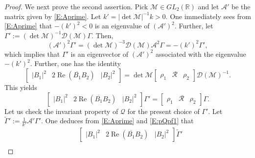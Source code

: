 \documentclass[11pt,a4paper,oneside]{amsart}
\theoremstyle{plain}
\theoremstyle{remark}
\numberwithin{equation}{section}
\newcommand{\R}{\mathbb{R}}
\renewcommand{\Re}{\operatorname{Re}}
\theoremstyle{definition}
\begin{document}
\begin{proof}
We next prove the second assertion.
Pick $\mathscr{M} \in GL_2(\R)$ and let $\mathscr{A}'$ be the matrix given by \eqref{E:Aprime}.
Let $k'=|\det \mathscr{M}|^{-1} k>0$.
One immediately sees from \eqref{E:Aprime} that $- (k')^2<0$ is an eigenvalue of $(\mathscr{A}')^2$.
Further,
let
$\Gamma':=(\det \mathscr{M})^{-1}\mathscr{D}(\mathscr{M}) \Gamma$.
Then, %
\[
	(\mathscr{A}')^2 \Gamma'
	= (\det \mathscr{M})^{-3} \mathscr{D}(\mathscr{M}) \mathscr{A}^2 \Gamma
	= - (k')^2 \Gamma',
\]
which implies that $\Gamma'$ is an eigenvector of $(\mathscr{A}')^2$ associated with the eigenvalue
$- (k')^2$.
Further, one has the identity
\begin{equation}\label{E:pQpf1}
	\begin{bmatrix} |B_1|^2 & 2\Re (\overline{B_1}B_2) & |B_2|^2
	\end{bmatrix} = \det \mathscr{M}
	\begin{bmatrix} \rho_1 & \mathcal{R} & \rho_2
	\end{bmatrix}\mathscr{D}(\mathscr{M})^{-1}.
\end{equation}
This yields
\begin{equation}\label{E:pQpf2}
	\begin{bmatrix} |B_1|^2 & 2\Re (\overline{B_1}B_2) & |B_2|^2
	\end{bmatrix}\Gamma' = 
	\begin{bmatrix} \rho_1 & \mathcal{R} & \rho_2
	\end{bmatrix}\Gamma .
\end{equation}
Let us check the invariant property of $\mathcal{Q}$ for the present choice of $
\Gamma'$.
Let $\widetilde{\Gamma}':=
\frac1{k'}\mathscr{A}'\Gamma'$.
One deduces from \eqref{E:Aprime} and \eqref{E:pQpf1} that
\begin{align*}
	&\begin{bmatrix}|B_1|^2 &2\Re (\overline{B_1}B_2) & |B_2|^2\end{bmatrix} \widetilde{\Gamma}'\\

\end{align*}
\end{proof}
\end{document}
